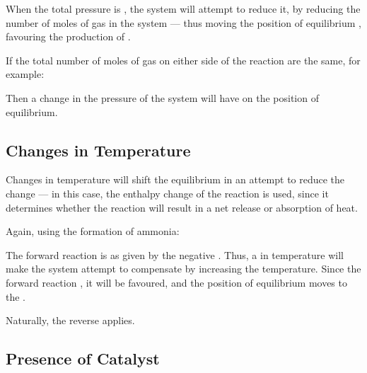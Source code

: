 			When the total pressure is , the system will attempt to reduce it, by reducing the number of moles of gas
			in the system --- thus moving the position of equilibrium , favouring the production of .

			If the total number of moles of gas on either side of the reaction are the same, for example:


			Then a change in the pressure of the system will have  on the position of equilibrium.



		\subsection{Changes in Temperature}

			Changes in temperature will shift the equilibrium in an attempt to reduce the change --- in this case, the enthalpy change
			of the reaction is used, since it determines whether the reaction will result in a net release or absorption of heat.

			Again, using the formation of ammonia:


			The forward reaction is  as given by the negative \enth{}. Thus, a  in temperature will
			make the system attempt to compensate by increasing the temperature. Since the forward reaction , it will
			be favoured, and the position of equilibrium moves to the .

			Naturally, the reverse applies.



		\subsection{Presence of Catalyst}

